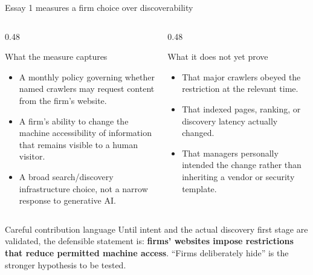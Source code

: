 \documentclass[aspectratio=169,10pt]{beamer}
\newcommand{\tightitems}{\setlength\itemsep{0.11cm}\setlength\parskip{0pt}}
\begin{document}
\begin{frame}[t]{Essay 1 measures a firm choice over discoverability}
\begin{columns}[T,onlytextwidth]
  \begin{column}{0.48\textwidth}
    \begin{block}{What the measure captures}
    \small
    \begin{itemize}\tightitems
      \item A monthly policy governing whether named crawlers may request content from the firm's website.
      \item A firm's ability to change the machine accessibility of information that remains visible to a human visitor.
      \item A broad search/discovery infrastructure choice, not a narrow response to generative AI.
    \end{itemize}
    \end{block}
  \end{column}
  \begin{column}{0.48\textwidth}
    \begin{block}{What it does not yet prove}
    \small
    \begin{itemize}\tightitems
      \item That major crawlers obeyed the restriction at the relevant time.
      \item That indexed pages, ranking, or discovery latency actually changed.
      \item That managers personally intended the change rather than inheriting a vendor or security template.
    \end{itemize}
    \end{block}
  \end{column}
\end{columns}

\begin{exampleblock}{Careful contribution language}
Until intent and the actual discovery first stage are validated, the defensible statement is: \textbf{firms' websites impose restrictions that reduce permitted machine access}. ``Firms deliberately hide'' is the stronger hypothesis to be tested.
\end{exampleblock}
\end{frame}
\end{document}
